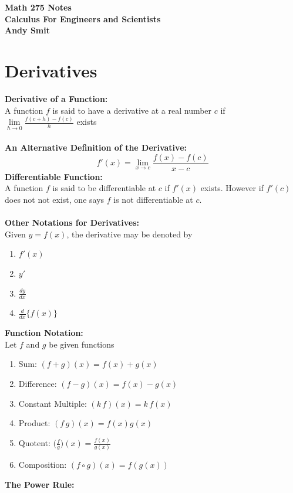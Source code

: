 \documentclass[14pt]{article}
\begin{document}
    \begin{center}
        \textbf{Math 275 Notes\\ Calculus For Engineers and Scientists\\Andy Smit}
    \end{center}
    \section{Derivatives}
    \textbf{Derivative of a Function: }\\
    A function $f$ is said to have a derivative at a real number $c$ if
    \\$\lim \limits_{h\rightarrow 0} \frac{f(c+h)-f(c)}{h}$ exists \\\\
    \textbf{An Alternative Definition of the Derivative:}
    $$f'(x)=\lim \limits_{x \rightarrow c} \frac{f(x)-f(c)}{x-c}$$
    \textbf{Differentiable Function:}\\
    A function $f$ is said to be differentiable at $c$ if $f'(x)$
    exists. However if $f'(c)$ does not not exist, one says $f$ is not
    differentiable at $c$. \\\\
    \textbf{Other Notations for Derivatives:}\\
    Given $y=f(x)$, the derivative may be denoted by
    \begin{enumerate}
        \item $f'(x)$
        \item $y'$
        \item $\frac{dy}{dx}$
        \item $\frac{d}{dx} \Big\{f(x)\Big\}$
    \end{enumerate}
    \textbf{Function Notation:}\\
    Let $f$ and $g$ be given functions
    \begin{enumerate}
        \item Sum: $(f+g)(x)=f(x)+g(x)$
        \item Difference: $(f-g)(x)=f(x)-g(x)$
        \item Constant Multiple: $(k\, f)(x)=k\,f(x)$
        \item Product: $(f\,g)(x)=f(x)g(x)$
        \item Quotent: $\bigg(\frac{f}{g}\bigg)(x)=\frac{f(x)}{g(x)}$
        \item Composition: $(f \circ g)(x)=f(g(x))$
    \end{enumerate}
    \textbf{The Power Rule:}
\end{document}
